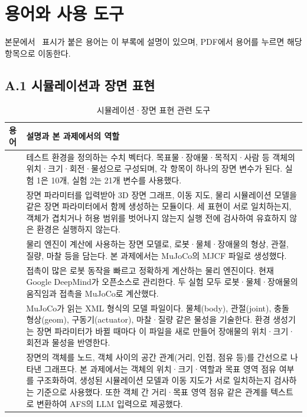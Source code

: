 \section{용어와 사용 도구}
본문에서 \dag\ 표시가 붙은 용어는 이 부록에 설명이 있으며, PDF에서 용어를 누르면 해당 항목으로 이동한다.
\subsection*{A.1 시뮬레이션과 장면 표현}
\begin{table}[H]
\centering\small
\caption{시뮬레이션·장면 표현 관련 도구}
\begin{tabularx}{\linewidth}{@{}>{\raggedright\arraybackslash}p{30mm}Y@{}}
\toprule
용어 & 설명과 본 과제에서의 역할 \\
\midrule
{} & 테스트 환경을 정의하는 수치 벡터다. 목표물·장애물·목적지·사람 등 객체의 위치·크기·회전·물성으로 구성되며, 각 항목이 하나의 장면 변수가 된다. 실험 1은 10개, 실험 2는 21개 변수를 사용했다. \\
 & 장면 파라미터를 입력받아 3D 장면 그래프, 이동 지도, 물리 시뮬레이션 모델을 같은 장면 파라미터에서 함께 생성하는 모듈이다. 세 표현이 서로 일치하는지, 객체가 겹치거나 허용 범위를 벗어나지 않는지 실행 전에 검사하여 유효하지 않은 환경은 실행하지 않는다. \\
 & 물리 엔진이 계산에 사용하는 장면 모델로, 로봇·물체·장애물의 형상, 관절, 질량, 마찰 등을 담는다. 본 과제에서는 MuJoCo의 MJCF 파일로 생성했다. \\
 & 접촉이 많은 로봇 동작을 빠르고 정확하게 계산하는 물리 엔진이다. 현재 Google DeepMind가 오픈소스로 관리한다. 두 실험 모두 로봇·물체·장애물의 움직임과 접촉을 MuJoCo로 계산했다. \\
 & MuJoCo가 읽는 XML 형식의 모델 파일이다. 물체(body), 관절(joint), 충돌 형상(geom), 구동기(actuator), 마찰·질량 같은 물성을 기술한다. 환경 생성기는 장면 파라미터가 바뀔 때마다 이 파일을 새로 만들어 장애물의 위치·크기·회전과 물성을 반영한다. \\
 & 장면의 객체를 노드, 객체 사이의 공간 관계(거리, 인접, 점유 등)를 간선으로 나타낸 그래프다. 본 과제에서는 객체의 위치·크기·역할과 목표 영역 점유 여부를 구조화하여, 생성된 시뮬레이션 모델과 이동 지도가 서로 일치하는지 검사하는 기준으로 사용했다. 또한 객체 간 거리·목표 영역 점유 같은 관계를 텍스트로 변환하여 AFS의 LLM 입력으로 제공했다. \\

\end{tabularx}
\end{table}
